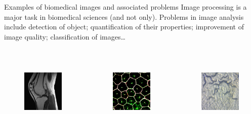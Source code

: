 \documentclass[9pt, aspectratio=169]{beamer}
\begin{document}
\begin{frame}
    {Examples of biomedical images and associated problems}
    Image processing is a major task in biomedical sciences (and not only).
    Problems in image analysis include detection of object; quantification of their properties; improvement of image quality; classification of images\dots

    \begin{columns}
        \begin{column}{0.25\textwidth}
            \begin{figure}
                \includegraphics[height=10em]{MRI - Becky Stern CC-BY-SA2.jpg}
                \caption{\color{gray}{Becky Stern - CC-BY-SA 2.0}}
            \end{figure}
        \end{column}
        \begin{column}{0.25\textwidth}
            \begin{figure}
                \includegraphics[height=10em]{Retinal pigment epithelium - NIH - CC BY-NC 2.0.jpg}
                \caption{\color{gray}{NIH - CC-BY-SA 2.0}}
            \end{figure}
        \end{column}
        \begin{column}{0.25\textwidth}
            \begin{figure}
                \includegraphics[height=10em]{c elegans - Zeiss - CC-BY 2.0.jpg}

\end{figure}
\end{column}
\end{columns}
\end{frame}
\end{document}
